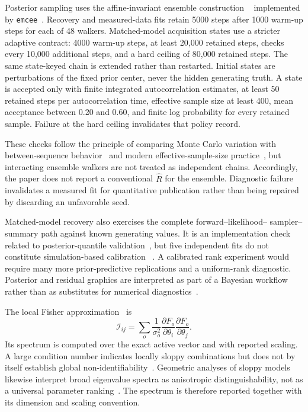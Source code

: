 Posterior sampling uses the affine-invariant ensemble construction
~\citep{goodman2010} implemented by \texttt{emcee}~\citep{foreman2013}.
Recovery and measured-data fits retain 5000 steps after 1000 warm-up
steps for each of 48 walkers. Matched-model acquisition states use a
stricter adaptive contract: 4000 warm-up steps, at least 20,000 retained
steps, checks every 10,000 additional steps, and a hard ceiling of
80,000 retained steps. The same state-keyed chain is extended rather
than restarted. Initial states are perturbations of the fixed prior
center, never the hidden generating truth. A state is accepted only with
finite integrated autocorrelation estimates, at least 50 retained steps
per autocorrelation time, effective sample size at least 400, mean
acceptance between 0.20 and 0.60, and finite log probability for every
retained sample. Failure at the hard ceiling invalidates that policy
record.

These checks follow the principle of comparing Monte Carlo variation
with between-sequence behavior~\citep{gelman1992} and modern
effective-sample-size practice~\citep{vehtari2021}, but interacting
ensemble walkers are not treated as independent chains. Accordingly, the
paper does not report a conventional \(\widehat R\) for the ensemble.
Diagnostic failure invalidates a measured fit for quantitative
publication rather than being repaired by discarding an unfavorable
seed.

Matched-model recovery also exercises the complete forward--likelihood--
sampler--summary path against known generating values. It is an
implementation check related to posterior-quantile
validation~\citep{cook2006}, but five independent fits do not constitute
simulation-based calibration ~\citep{talts2018}. A calibrated rank
experiment would require many more prior-predictive replications and a
uniform-rank diagnostic. Posterior and residual graphics are interpreted
as part of a Bayesian workflow rather than as substitutes for numerical
diagnostics~\citep{gelman1996, gabry2019}.

The local Fisher approximation~\citep{fisher1922} is
\[\mathcal I_{ij}=\sum_o\frac{1}{\sigma_o^2}
 \frac{\partial F_o}{\partial\theta_i}
 \frac{\partial F_o}{\partial\theta_j}.\] Its spectrum is computed over
the exact active vector and with reported scaling. A large condition
number indicates locally sloppy combinations but does not by itself
establish global non-identifiability~\citep{gutenkunst2007}. Geometric
analyses of sloppy models likewise interpret broad eigenvalue spectra as
anisotropic distinguishability, not as a universal parameter
ranking~\citep{transtrum2015}. The spectrum is therefore reported
together with its dimension and scaling convention.

